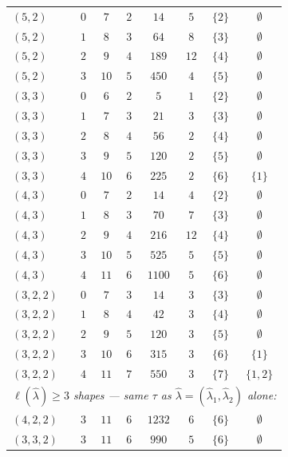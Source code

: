 \documentclass[11pt]{article}
\theoremstyle{definition}
\newcommand{\hatl}{\widehat\lambda}
\begin{document}
\begin{table}[h]
\begin{tabular}{l|c|c|c|c|c|c|c}
\midrule
$(5, 2)$ & $0$ & $7$  & $2$ & $14$  & $5$ & $\{2\}$ & $\emptyset$ \\
$(5, 2)$ & $1$ & $8$  & $3$ & $64$  & $8$ & $\{3\}$ & $\emptyset$ \\
$(5, 2)$ & $2$ & $9$  & $4$ & $189$ & $12$ & $\{4\}$ & $\emptyset$ \\
$(5, 2)$ & $3$ & $10$ & $5$ & $450$ & $4$ & $\{5\}$ & $\emptyset$ \\
\midrule
$(3, 3)$ & $0$ & $6$  & $2$ & $5$   & $1$ & $\{2\}$ & $\emptyset$ \\
$(3, 3)$ & $1$ & $7$  & $3$ & $21$  & $3$ & $\{3\}$ & $\emptyset$ \\
$(3, 3)$ & $2$ & $8$  & $4$ & $56$  & $2$ & $\{4\}$ & $\emptyset$ \\
$(3, 3)$ & $3$ & $9$  & $5$ & $120$ & $2$ & $\{5\}$ & $\emptyset$ \\
$(3, 3)$ & $4$ & $10$ & $6$ & $225$ & $2$ & $\{6\}$ & $\{1\}$ \\
\midrule
$(4, 3)$ & $0$ & $7$  & $2$ & $14$  & $4$ & $\{2\}$ & $\emptyset$ \\
$(4, 3)$ & $1$ & $8$  & $3$ & $70$  & $7$ & $\{3\}$ & $\emptyset$ \\
$(4, 3)$ & $2$ & $9$  & $4$ & $216$ & $12$ & $\{4\}$ & $\emptyset$ \\
$(4, 3)$ & $3$ & $10$ & $5$ & $525$ & $5$ & $\{5\}$ & $\emptyset$ \\
$(4, 3)$ & $4$ & $11$ & $6$ & $1100$ & $5$ & $\{6\}$ & $\emptyset$ \\
\midrule
$(3, 2, 2)$ & $0$ & $7$  & $3$ & $14$  & $3$ & $\{3\}$ & $\emptyset$ \\
$(3, 2, 2)$ & $1$ & $8$  & $4$ & $42$  & $3$ & $\{4\}$ & $\emptyset$ \\
$(3, 2, 2)$ & $2$ & $9$  & $5$ & $120$ & $3$ & $\{5\}$ & $\emptyset$ \\
$(3, 2, 2)$ & $3$ & $10$ & $6$ & $315$ & $3$ & $\{6\}$ & $\{1\}$ \\
$(3, 2, 2)$ & $4$ & $11$ & $7$ & $550$ & $3$ & $\{7\}$ & $\{1, 2\}$ \\
\midrule
\multicolumn{8}{c}{\emph{$\ell(\hatl) \ge 3$ shapes — same $\tau$ as $\hatl = (\hatl_1, \hatl_2)$ alone:}}\\
$(4, 2, 2)$ & $3$ & $11$ & $6$ & $1232$ & $6$ & $\{6\}$ & $\emptyset$ \\
$(3, 3, 2)$ & $3$ & $11$ & $6$ & $990$ & $5$ & $\{6\}$ & $\emptyset$ \\
\bottomrule
\end{tabular}
\end{table}
\end{document}
